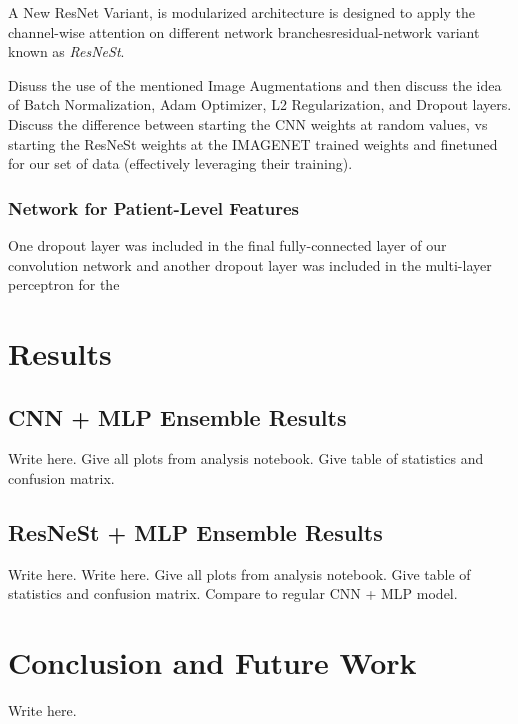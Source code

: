 \documentclass [MAS] {uclathes}
\begin{document}
A New ResNet Variant, is modularized architecture is designed to apply the channel-wise attention on different network branchesresidual-network variant known as \textit{ResNeSt}.

Disuss the use of the mentioned Image Augmentations and then discuss the idea of Batch Normalization, Adam Optimizer, L2 Regularization, and Dropout layers. Discuss the difference between starting the CNN weights at random values, vs starting the ResNeSt weights at the IMAGENET trained weights and finetuned for our set of data (effectively leveraging their training).

\subsection{Network for Patient-Level Features}


One dropout layer was included in the final fully-connected layer of our convolution network and another dropout layer was included in the multi-layer perceptron for the 


\chapter{Results}


\section{CNN + MLP Ensemble Results}

Write here. Give all plots from analysis notebook. Give table of statistics and confusion matrix.

\section{ResNeSt + MLP Ensemble Results}

Write here. Write here. Give all plots from analysis notebook. Give table of statistics and confusion matrix. Compare to regular CNN + MLP model.


\chapter{Conclusion and Future Work}

Write here.



\end{document}
